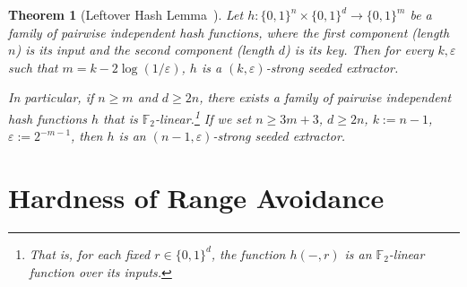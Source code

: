 \documentclass[10pt,a4paper]{article}
\newtheorem{theorem}{Theorem}[section]
\theoremstyle{definition}
\theoremstyle{remark}
\newcommand{\eps}{\varepsilon}
\newcommand{\F}{\mathbb{F}}
\begin{document}
\begin{theorem}[Leftover Hash Lemma~\cite{ILL89}]\label{thm:lhl}
	Let $h: \{0, 1\}^n \times \{0, 1\}^d \to \{0, 1\}^m$ be a family of pairwise independent hash functions, where the first component (length $n$) is its input and the second component (length $d$) is its key. Then for every $k, \eps$ such that $m = k - 2\log(1/\eps)$, $h$ is a $(k, \eps)$-strong seeded extractor.

    In particular, if $n\geq m$ and $d\geq 2n$, there exists a family of pairwise independent hash functions $h$ that is $\F_2$-linear.\footnote{That is, for each fixed $r\in \{0, 1\}^d$, the function $h(-, r)$ is an $\F_2$-linear function over its inputs.} If we set $n\geq 3m+3$, $d\geq 2n$, $k:=n-1$, $\eps := 2^{-m-1}$, then $h$ is an $(n-1, \eps)$-strong seeded extractor.
\end{theorem}


\section{Hardness of Range Avoidance}\label{sec: Avoid notin FP}
\end{document}
